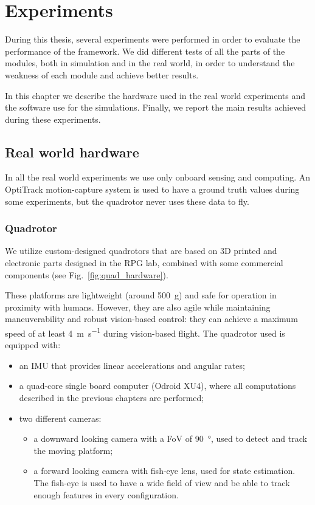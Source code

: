 \chapter{Experiments}\label{chap:experiments}
During this thesis, several experiments were performed in order to evaluate the performance of the framework.
We did different tests of all the parts of the modules, both in simulation and in the real world, in order to understand the weakness of each module and achieve better results.

In this chapter we describe the hardware used in the real world experiments and the software use for the simulations.
Finally, we report the main results achieved during these experiments.

\section{Real world hardware}
In all the real world experiments we use only onboard sensing and computing.
An OptiTrack motion-capture system \cite{optitrack} is used to have a ground truth values during some experiments, but the quadrotor never uses these data to fly.

\subsection{Quadrotor}
We utilize custom-designed quadrotors that are based on 3D printed and electronic parts designed in the RPG lab, combined with some commercial components (see Fig.~\ref{fig:quad_hardware}).

These platforms are lightweight (around \SI{500}{\gram}) and safe for operation in proximity with humans. However, they are also agile while maintaining maneuverability and robust vision-based control: they can achieve a maximum speed of at least \SI{4}{\meter \per \second} during vision-based flight.
The quadrotor used is equipped with:
\begin{itemize}
\item an IMU that provides linear accelerations and angular rates;
\item a quad-core single board computer (Odroid XU4), where all computations described in the previous chapters are performed;
\item two different cameras:
\begin{itemize}
\item a downward looking camera with a FoV of \SI{90}{\degree}, used to detect and track the moving platform;
\item a forward looking camera with fish-eye lens, used for state estimation. The fish-eye is used to have a wide field of view and be able to track enough features in every configuration.
\end{itemize}
\end{itemize}

